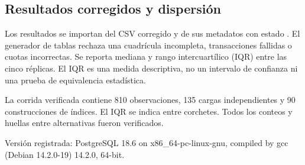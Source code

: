 \documentclass[11pt,a4paper]{article}
\newcommand{\code}[1]{\texttt{\detokenize{#1}}}
\begin{document}
\subsection{Resultados corregidos y dispersión}

Los resultados se importan del CSV corregido y de sus metadatos con estado
\code{completed}. El generador de tablas rechaza una cuadrícula incompleta,
transacciones fallidas o cuotas incorrectas. Se reporta mediana y rango
intercuartílico (IQR) entre las cinco réplicas. El IQR es una medida descriptiva,
no un intervalo de confianza ni una prueba de equivalencia estadística.

La corrida verificada contiene 810 observaciones, 135 cargas independientes y
90 construcciones de índices. El IQR se indica entre corchetes. Todos los
conteos y huellas entre alternativas fueron verificados.

Versión registrada: PostgreSQL 18.6 on x86\_64-pc-linux-gnu, compiled by gcc
(Debian 14.2.0-19) 14.2.0, 64-bit.\par

\begin{table}[htbp]
\centering\small
\caption{Construcción (ms): mediana [IQR], y tamaño inicial (MiB).}
\label{tab:build}
\end{table}
\end{document}
